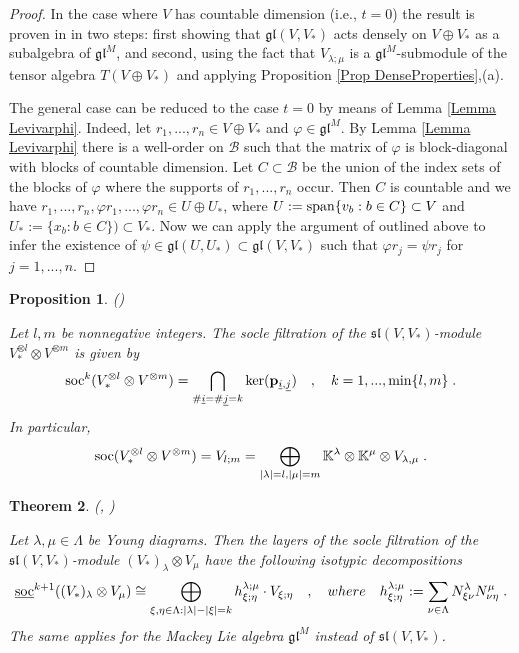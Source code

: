 \documentclass[12pt]{article}
\def\KK {{\mathbb K}}     %
\def\B  {\mathcal B}
\def\mk {\mathfrak}
\def\ul  {\underline}
\newtheorem{theorem}{Theorem}[section]
\newtheorem{prop}[theorem]{Proposition}
\begin{document}
\begin{proof}
In the case where $V$ has countable dimension (i.e., $t=0$) the result is proven in \cite{Penkov-Serganova-Mackey} in two steps: first showing that $\mk{gl}(V,V_*)$ acts densely on $V\oplus V_*$ as a subalgebra of $\mk{gl}^M$, and second, using the fact that $V_{\lambda;\mu}$ is a $\mk{gl}^M$-submodule of the tensor algebra $T(V\oplus V_*)$ and applying Proposition \ref{Prop DenseProperties},(a).

The general case can be reduced to the case $t=0$ by means of Lemma \ref{Lemma Levivarphi}. Indeed, let $r_1,...,r_n\in V\oplus V_*$ and $\varphi\in\mk{gl}^M$. By Lemma \ref{Lemma Levivarphi} there is a well-order on $\B$ such that the matrix of $\varphi$ is block-diagonal with blocks of countable dimension. Let $C\subset\B$ be the union of the index sets of the blocks of $\varphi$ where the supports of $r_1,...,r_n$ occur. Then $C$ is countable and we have $r_1,...,r_n,\varphi r_1,...,\varphi r_n\in U\oplus U_*$, where $U:={\rm span}\{v_b:b\in C\}\subset V$ and $U_*:=\{x_b:b\in C\})\subset V_*$. Now we can apply the argument of \cite{Penkov-Serganova-Mackey} outlined above to infer the existence of $\psi\in\mk{gl}(U,U_*)\subset\mk{gl}(V,V_*)$ such that $\varphi r_j=\psi r_j$ for $j=1,...,n$.
\end{proof}







\begin{prop} (\cite[Theorem~4.1]{Penkov-Serganova-Mackey})

Let $l,m$ be nonnegative integers. The socle filtration of the $\mk{sl}(V, V_*)$-module $V_*^{\otimes l}\otimes V^{\otimes m}$ is given by
$$
{\rm soc}^k(V_*^{\otimes l}\otimes V^{\otimes m}) = \bigcap\limits_{\#\ul{i}=\#\ul{j}=k} {\rm ker}({\bf p}_{\ul{i},\ul{j}}) \quad,\quad k=1,...,\min\{l,m\}\;. 
$$
In particular,
$$
{\rm soc}(V_*^{\otimes l}\otimes V^{\otimes m}) = V_{l;m} = \bigoplus\limits_{|\lambda|=l,|\mu|=m} \KK^\lambda\otimes \KK^\mu\otimes V_{\lambda,\mu} \;.
$$
\end{prop}


\begin{theorem}\label{Theo PS soc filt Vlambda TENS Vmu} (\cite[Th.~2.3]{Penkov-Styrkas}, \cite[\S~4]{Penkov-Serganova-Mackey})

Let $\lambda,\mu\in\Lambda$ be Young diagrams. Then the layers of the socle filtration of the $\mk{sl}(V,V_*)$-module $(V_*)_\lambda\otimes V_\mu$ have the following isotypic decompositions
\begin{gather}\label{For h lambdamuxieta}
\ul{\rm soc}^{k+1}((V_*)_\lambda\otimes V_\mu) \cong \bigoplus\limits_{\xi,\eta\in\Lambda:|\lambda|-|\xi|=k} h^{\lambda;\mu}_{\xi;\eta}\cdot V_{\xi;\eta} \quad,\quad where\quad h^{\lambda;\mu}_{\xi;\eta}:=\sum\limits_{\nu\in\Lambda} N^\lambda_{\xi\nu} N^\mu_{\nu\eta} \;.
\end{gather}
The same applies for the Mackey Lie algebra $\mk{gl}^M$ instead of $\mk{sl}(V,V_*)$.
\end{theorem}
\end{document}
